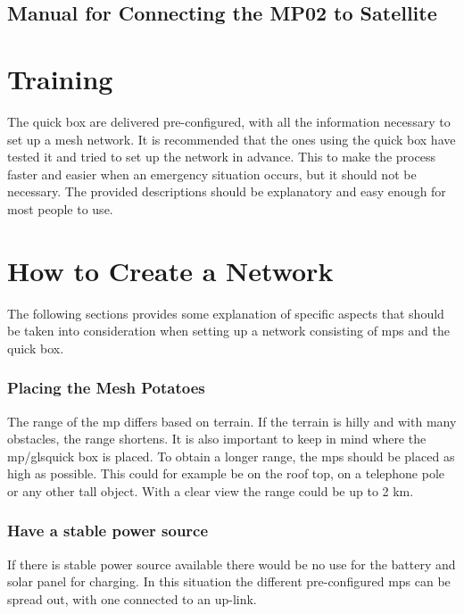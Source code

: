 
\clearpage

 
\clearpage
\subsection{Manual for Connecting the MP02 to Satellite}


\section{Training}
The \gls{quick} box are delivered pre-configured, with all the  information necessary to set up a mesh network. It is recommended that the ones using the \gls{quick} box have tested it and tried to set up the network in advance. This to make the process faster and easier when an emergency situation occurs, but it should not be necessary. The provided descriptions should be explanatory and easy enough for most people to use.


\section{How to Create a Network}
The following sections provides some explanation of specific aspects that should be taken into consideration when setting up a network consisting of \glspl{mp} and the \gls{quick} box. 

\subsubsection{Placing the Mesh Potatoes}
The range of the \gls{mp} differs based on terrain. If the terrain is hilly and with many obstacles, the range shortens. It is also important to keep in mind where the \gls{mp}/gls{quick} box is placed. To obtain a longer range, the \glspl{mp} should be placed as high as possible. This could for example be on the roof top, on a telephone pole or any other tall object. With a clear view the range could be up to 2 km. 

\subsubsection{Have a stable power source}
If there is stable power source available there would be no use for the battery and solar panel for charging. In this situation the different pre-configured \glspl{mp} can be spread out, with one connected to an up-link. 

